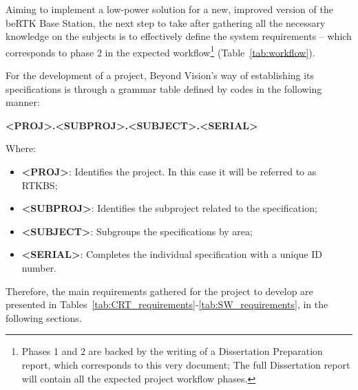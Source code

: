Aiming to implement a low-power solution for a new, improved version of the beRTK\textsuperscript{\textregistered} Base Station, the next step to take after gathering all the necessary knowledge on the subjects is to effectively define the system requirements -- which corresponds to phase 2 in the expected workflow\footnote{Phases 1 and 2 are backed by the writing of a Dissertation Preparation report, which corresponds to this very document; The full Dissertation report will contain all the expected project workflow phases.} (Table~\ref{tab:workflow}).

For the development of a project, Beyond Vision's way of establishing its specifications is through a grammar table defined by codes in the following manner:

\begin{center}
	\textbf{<PROJ>.<SUBPROJ>.<SUBJECT>.<SERIAL>}
\end{center}
Where:
\begin{itemize}
	\item \textbf{<PROJ>}: Identifies the project. In this case it will be referred to as RTKBS;
	\item \textbf{<SUBPROJ>}: Identifies the subproject related to the specification;
	\item \textbf{<SUBJECT>}: Subgroups the specifications by area;
	\item \textbf{<SERIAL>}: Completes the individual specification with a unique ID number.
\end{itemize}

Therefore, the main requirements gathered for the project to develop are presented in Tables~\ref{tab:CRT_requirements}-\ref{tab:SW_requirements}, in the following sections.

